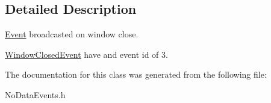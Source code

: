 \subsection{Detailed Description}
\mbox{\hyperlink{class_arcana_1_1_event}{Event}} broadcasted on window close. 

\mbox{\hyperlink{class_arcana_1_1_window_closed_event}{Window\+Closed\+Event}} have and event id of 3. 

The documentation for this class was generated from the following file\+:\begin{DoxyCompactItemize}
\item 
No\+Data\+Events.\+h\end{DoxyCompactItemize}
